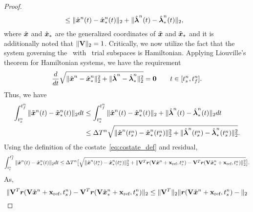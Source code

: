 \begin{proof}
\begin{align*}
&\le  \| \hat{ \boldsymbol x}^{n}(t) - \hat{ \boldsymbol x}_{*}^{n}(t) \|_2 + \|  \hat{\boldsymbol \lambda}^{n}(t) - 
 \hat{\boldsymbol \lambda}_*^{n}(t)  \|_2, 
\end{align*}
where $\hat{ \boldsymbol x}$ and $\hat{ \boldsymbol x}_{*}$ are the generalized coordinates of $\tilde{\boldsymbol x}$ and $\tilde{\boldsymbol x}_{*}$ and it is additionally noted that $\| \mathbf {V} \|_2 = 1$.
Critically, we now utilize the fact that the system governing the \methodAcronymROM\ with \spatialAcronym\ trial subspaces is Hamiltonian. 
Applying Liouville's theorem for Hamiltonian systems, we have the requirement 
$$ \frac{d}{dt}  \sqrt{ \| \hat{ \boldsymbol x}^{n} - \hat{ \boldsymbol x}_{*}^{n} \|_2^2 + \| \hat{\boldsymbol \lambda}^{n} - 
\hat{\boldsymbol \lambda}_*^{n}  \|_2^2}  = \boldsymbol 0 \qquad t \in [t_s^{n},t_f^{n}].$$
Thus, we have
\begin{align*}
\int_{t_s^{n}}^{t_f^{n}} \| \tilde{\boldsymbol x}^{n}(t) - \tilde{\boldsymbol x}_{*}^{n}(t) \|_2 dt &\le 
\int_{t_s^{n}}^{t_f^{n}} \| \hat{ \boldsymbol x}^{n}(t) - \hat{ \boldsymbol x}_{*}^{n}(t) \|_2 + \|  \hat{\boldsymbol \lambda}^{n}(t) - 
 \hat{\boldsymbol \lambda}_*^{n}(t)  \|_2 dt \\
&\le  \Delta T^{n}  \sqrt{ \| \hat{ \boldsymbol x}^{n}(t_s^{n}) - \hat{ \boldsymbol x}_{*}^{n}(t_s^{n} ) \|_2^2 + \| \hat{\boldsymbol \lambda}^{n}(t_s^{n}) - 
\hat{\boldsymbol \lambda}_*^{n}(t_s^{n})   \|_2^2}.
\end{align*}
Using the definition of the costate~\eqref{eq:costate_def} and residual, 
\begin{equation*}
\int_{t_s^{n}}^{t_f^{n}} \| \tilde{\boldsymbol x}^{n}(t) - \tilde{\boldsymbol x}_{*}^{n}(t) \|_2 dt 
\le  \Delta T^{n} \big[ \sqrt{ \| \hat{ \boldsymbol x}^{n}(t_s^{n}) - \hat{ \boldsymbol x}_{*}^{n}(t_s^{n} ) \|_2^2 +   \| \mathbf {V}^T \boldsymbol r( \mathbf {V} \tilde{\boldsymbol x}^{n} + \mathbf{x}_\text{ref} , {t_s^{n}} ) - 
 \mathbf {V}^T \boldsymbol r( \mathbf {V} \tilde{\boldsymbol x}_{*}^{n} + \mathbf{x}_\text{ref}, {t_s^{n}}  ) \|_2^2  } \big].
\end{equation*}
As, 
\begin{equation*}
\| \mathbf {V}^T \boldsymbol r( \mathbf {V} \tilde{\boldsymbol x}^{n} + \mathbf{x}_\text{ref} , {t_s^{n}}) - 
 \mathbf {V}^T \boldsymbol r( \mathbf {V} \tilde{\boldsymbol x}_{*}^{n} + \mathbf{x}_\text{ref}, {t_s^{n}}  ) \|_2
\le
 \| \mathbf {V}^T \|_2 \|  \boldsymbol r( \mathbf {V} \tilde{\boldsymbol x}^{n} + \mathbf{x}_\text{ref} , {t_s^{n}}) - 
 \|_2
\end{equation*}
\end{proof}
